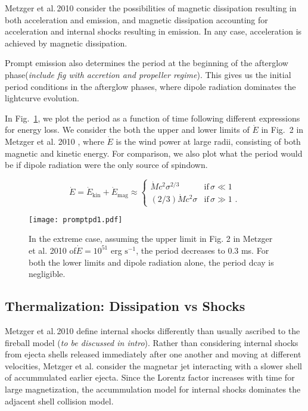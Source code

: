 \documentclass{article}
\begin{document}
Metzger et al.\,2010 \cite{Metzger:2010pp} consider the possibilities of magnetic dissipation resulting in both acceleration and emission, and magnetic dissipation accounting for acceleration and internal shocks resulting in emission. In any case, acceleration is achieved by magnetic dissipation.

Prompt emission also determines the period at the beginning of the afterglow phase(\textit{include fig with accretion and propeller regime}). This gives us the initial period conditions in the afterglow phases, where dipole radiation dominates the lightcurve evolution. 

In Fig.~\ref{fig:7}, we plot the period as a function of time following different expressions for energy loss. We consider the both the upper and lower limits of $\dot{E}$ in Fig.~2 in Metzger et al. 2010 \cite{Metzger:2010pp}, where $\dot{E}$ is the wind power at large radii, consisting of both magnetic and kinetic energy. For comparison, we also plot what the period would be if dipole radiation were the only source of spindown.

\begin{equation}
\dot{E} =\dot{E}_\mathrm{kin}+\dot{E}_\mathrm{mag} \approx
\begin{cases}
\dot{M} c^2 \sigma^{2/3}& \text{if}\, \sigma \ll 1 \\
(2/3) \dot{M} c^2 \sigma & \text{if}\, \sigma \gg 1\,\,.
\end{cases}
\end{equation}

\begin{figure}[h!]
\centering
\texttt{[image: promptpd1.pdf]}
\caption{In the extreme case, assuming the upper limit in Fig. 2 in Metzger et al. 2010 of$\dot{E}=10^{51}$ erg $\mathrm{s}^{-1}$, the period decreases to 0.3 ms. For both the lower limits and dipole radiation alone, the period dcay is negligible.}

\label{fig:7}
\end{figure}

\subsection{Thermalization: Dissipation vs Shocks} \label{sec:therm}

Metzger et al.\,2010 \cite{Metzger:2010pp} define internal shocks differently than usually ascribed to the fireball model (\textit{to be discussed in intro}). Rather than considering internal shocks from ejecta shells released immediately after one another and moving at different velocities, Metzger et al. consider the magnetar jet interacting with a slower shell of accummulated earlier ejecta. Since the Lorentz factor increases with time for large magnetization, the accummulation model for internal shocks dominates the adjacent shell collision model.
\end{document}
